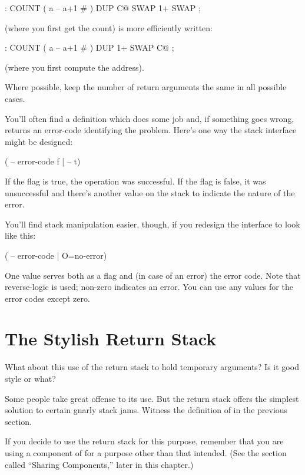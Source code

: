 \begin{Code}
: COUNT  ( a -- a+1 # )  DUP C@  SWAP 1+  SWAP ;
\end{Code}
(where you first get the count) is more efficiently written:

\begin{Code}
: COUNT  ( a -- a+1 # )  DUP 1+  SWAP C@ ;
\end{Code}
(where you first compute the address).
\goodbreak

\begin{tip}
Where possible, keep the number of return arguments the same in all
possible cases.
\end{tip}%
You'll often find a definition which does some job and, if something goes
wrong, returns an error-code identifying the problem. Here's one way
the stack interface might be designed:

\begin{Code}
( -- error-code f | -- t)
\end{Code}
If the flag is true, the operation was successful. If the flag is false,
it was unsuccessful and there's another value on the stack to indicate the
nature of the error.

You'll find stack manipulation easier, though, if you redesign the interface
to look like this:

\begin{Code}
( -- error-code | O=no-error)
\end{Code}
One value serves both as a flag and (in case of an error) the error code.
Note that reverse-logic is used; non-zero indicates an error. You can use
any values for the error codes except zero.%
%

\section{The Stylish Return Stack}%

What about this use of the return stack to hold temporary arguments? Is
it good style or what?

Some people take great offense to its use. But the return stack
offers the simplest solution to certain gnarly stack jams. Witness the
definition of  in the previous section.

If you decide to use the return stack for this purpose, remember
that you are using a component of \Forth{} for a purpose other than that
intended. (See the section called ``Sharing Components,'' later in this
chapter.)

